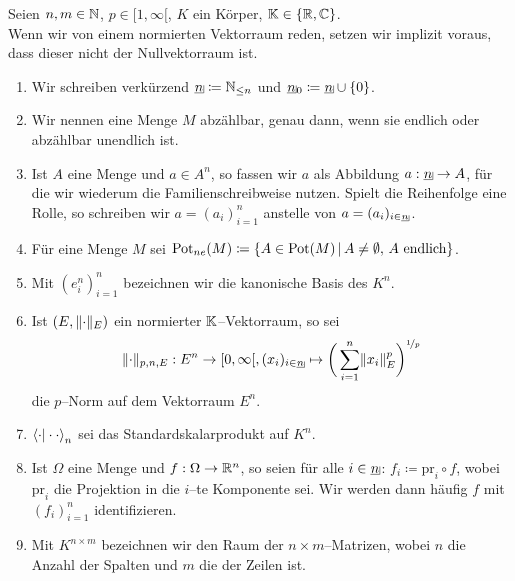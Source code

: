 Seien $n,m\in \mathbb{N}$, $p \in [1, \infty[$, $K$ ein Körper, $\mathbb{K}\in\left\{\mathbb{R}, \mathbb C\right\}$.\\
Wenn wir von einem normierten Vektorraum reden, setzen wir implizit voraus,
dass dieser nicht der Nullvektorraum ist.

\begin{enumerate}[(1)]
 \item \label{Bez1}
       Wir schreiben verkürzend $\haken n \coloneqq  \N_{\le n}$ und
       $\haken n _0\coloneqq \haken n \cup \meng 0$.
 \item \label{Bez2}
       Wir nennen eine Menge $M$ abzählbar, genau dann, wenn sie endlich oder
       abzählbar unendlich ist.
 \item \label{Bez3}
       Ist $A$ eine Menge und $a \in A^n$, so fassen wir $a$ als Abbildung 
       $a : \haken n \rightarrow A$, für die wir wiederum die
       Familienschreibweise nutzen. Spielt die Reihenfolge eine Rolle, so
       schreiben wir $a = (a_i)_{i=1}^n$ anstelle von $a=(a_i)_{i\in\haken n}$.
 \item \label{Bez13}
       Für eine Menge $M$ sei 
       $\mathop{\textrm{Pot}}\nolimits_{ne}(M)\coloneqq \left\{A\in\mathop{\textrm{Pot}}\nolimits(M)\,|\,A\neq\emptyset,\,A\text{ endlich}\right\}$.
 \item \label{Bez4}
       Mit $(e^n_i)_{i =1}^n$ bezeichnen wir die kanonische Basis des
       $K^n$.
 \item \label{Bez5}
       Ist $(E, \lVert\cdot\rVert_E)$ ein normierter $\mathbb{K}$--Vektorraum, so sei
  \[
   \norm{\cdot}_{p, n, E}: E^n \rightarrow [0, \infty[, 
   \finfol x i n\mapsto\bigg(\sum_{i=1}^n \norm{x_i}^p_E\bigg)^{\nicefrac 1p}  
  \]
  die $p$--Norm auf dem Vektorraum $E^n$.
 \item \label{Bez6}
       $\left\langle \cdot |\cdot\cdot\right\rangle_n$ sei das Standardskalarprodukt auf $K^n$.
 \item \label{Bez7}
       Ist $\Omega$ eine Menge und $f:\Omega \rightarrow \mathbb{R}^n$, so seien für
       alle $i \in \haken n$: $f_i \coloneqq  \text{pr}_i \circ f$, wobei $\text{pr}_i$
       die Projektion in die $i$--te Komponente sei. Wir werden dann häufig $f$
       mit $(f_i)_{i=1}^n$ identifizieren.
 \item \label{Bez8}
       Mit $K^{n \times m}$ bezeichnen wir den Raum der $n\times m$--Matrizen,
       wobei $n$ die Anzahl der Spalten und $m$ die der Zeilen ist.
       

\end{enumerate}
